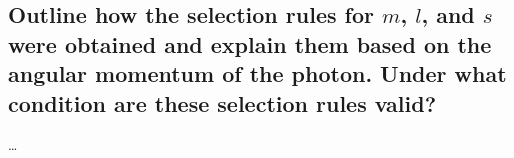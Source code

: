 \subsection{Outline how the selection rules for $m$, $l$, and $s$ were obtained and explain them based on the angular momentum of the photon. Under what condition are these selection rules valid?}


\ldots